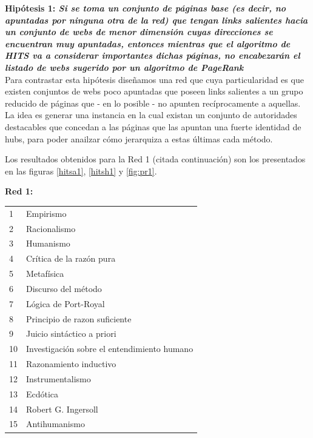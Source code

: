 \documentclass[a4paper]{article}
\begin{document}
\textbf{Hipótesis 1: \itshape{Si se toma un conjunto de páginas base (es decir, no apuntadas por ninguna otra de la red) que tengan links salientes hacia un conjunto de webs de menor dimensión cuyas direcciones se encuentran muy apuntadas, entonces mientras que el algoritmo de HITS va a considerar importantes dichas páginas, no encabezarán el listado de webs sugerido por un algoritmo de PageRank}}\\


Para contrastar esta hipótesis diseñamos una red que cuya particularidad es que existen conjuntos de webs poco apuntadas que poseen links salientes a un grupo reducido de páginas que - en lo posible - no apunten recíprocamente a aquellas. La idea es generar una instancia en la cual existan un conjunto de autoridades destacables  que concedan a las páginas que las apuntan una fuerte identidad de hubs, para poder anailzar cómo jerarquiza a estas últimas cada método.

Los resultados obtenidos para la Red 1  (citada continuación) son los presentados en las figuras \ref{hitsa1}, \ref{hitsh1} y \ref{fig:pr1}.

\textbf{Red 1:}\\

\begin{tabular}{l l}
1 & Empirismo \\
2 & Racionalismo \\
3 & Humanismo \\
4 & Crítica de la razón pura \\
5 & Metafísica \\
6 & Discurso del método \\
7 & Lógica de Port-Royal \\
8 & Principio de razon suficiente \\
9 & Juicio sintáctico a priori \\
10 & Investigación sobre el entendimiento humano \\
11 & Razonamiento inductivo \\
12 & Instrumentalismo \\
13 & Ecdótica \\
14 & Robert G. Ingersoll \\
15 & Antihumanismo \\
\end{tabular}
\end{document}
